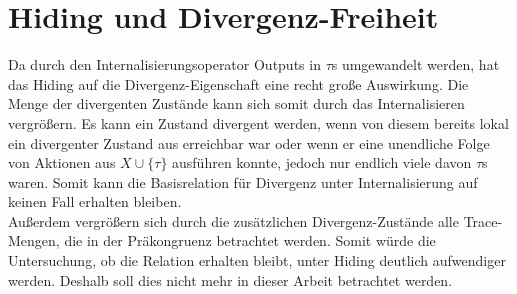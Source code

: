 \section{Hiding und Divergenz-Freiheit}

Da durch den Internalisierungsoperator Outputs in $\tau$s umgewandelt werden,
hat das Hiding auf die Divergenz-Eigenschaft eine recht große Auswirkung. Die
Menge der divergenten Zustände kann sich somit durch das Internalisieren
vergrößern. Es kann ein Zustand divergent werden, wenn von diesem bereits
lokal ein divergenter Zustand aus erreichbar war oder wenn er eine unendliche
Folge von Aktionen aus $X\cup\{\tau\}$ ausführen konnte, jedoch nur endlich
viele davon $\tau$s waren. Somit kann die Basisrelation für Divergenz unter
Internalisierung auf keinen Fall erhalten bleiben.\\
Außerdem vergrößern sich durch die zusätzlichen Divergenz-Zustände alle
Trace-Mengen, die in der Präkongruenz \DRel{} betrachtet werden. Somit würde
die Untersuchung, ob die Relation erhalten bleibt, unter Hiding deutlich
aufwendiger werden. Deshalb soll dies nicht mehr in dieser Arbeit betrachtet
werden.
